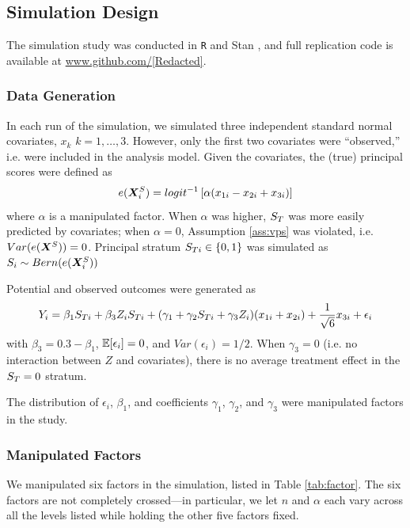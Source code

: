 \documentclass{statsoc} %
\begin{document}
\subsection{Simulation Design}
The simulation study was conducted in \texttt{R} \citep{rcite} and Stan \citep{rstan}, and full replication code is available at \url{www.github.com/[Redacted]}.
\subsubsection{Data Generation}

In each run of the simulation, we simulated three independent standard normal covariates, $x_k$ $k=1,\dots,3$. However, only the first two covariates were ``observed,'' i.e. were included in the analysis model.
Given the covariates, the (true) principal scores were defined as
\begin{equation*}
  e(\bm{X}^S_i)=logit^{-1}\left[\alpha(x_{1i}-x_{2i}+x_{3i})\right]
\end{equation*}
where $\alpha$ is a manipulated factor.
When $\alpha$ was higher, $S_T$ was more easily predicted by covariates; when $\alpha=0$, Assumption \ref{ass:vps} was violated, i.e. $Var(e(\bm{X}^S))=0$.
Principal stratum $S_{Ti}\in \{0,1\}$ was simulated as $S_i\sim Bern(e(\bm{X}^S_i))$

Potential and observed outcomes were generated as 
\begin{equation}\label{eq:y-sim}
Y_i=\beta_1\sti+\beta_3Z_i\sti+(\gamma_1+\gamma_2\sti+\gamma_3Z_i)(x_{1i}+x_{2i})+\frac{1}{\sqrt{6}}x_{3i}+\epsilon_i%
\end{equation}
with $\beta_3=0.3-\beta_1$, $\mathbb{E}[\epsilon_i]=0$, and $Var(\epsilon_i)=1/2$. When $\gamma_3=0$ (i.e. no interaction between $Z$ and covariates), there is no average treatment effect in the $S_T=0$ stratum.

The distribution of $\epsilon_i$, $\beta_1$, and coefficients $\gamma_1$, $\gamma_2$, and $\gamma_3$ were manipulated factors in the study.


\subsubsection{Manipulated Factors}
We manipulated six factors in the simulation, listed in Table \ref{tab:factor}.
The six factors are not completely crossed---in particular, we let $n$ and $\alpha$ each vary across all the levels listed while holding the other five factors fixed.
\end{document}
